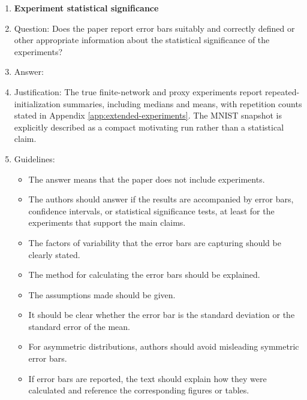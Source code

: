 \documentclass{article}
\begin{document}
\begin{enumerate}[leftmargin=1.5em]
\item {\bf Experiment statistical significance}
    \item[] Question: Does the paper report error bars suitably and correctly defined or other appropriate information about the statistical significance of the experiments?
    \item[] Answer: \answerYes{}
    \item[] Justification: The true finite-network and proxy experiments report repeated-initialization summaries, including medians and means, with repetition counts stated in Appendix \ref{app:extended-experiments}. The MNIST snapshot is explicitly described as a compact motivating run rather than a statistical claim.
    \item[] Guidelines:
    \begin{itemize}
        \item The answer \answerNA{} means that the paper does not include experiments.
        \item The authors should answer \answerYes{} if the results are accompanied by error bars, confidence intervals, or statistical significance tests, at least for the experiments that support the main claims.
        \item The factors of variability that the error bars are capturing should be clearly stated.
        \item The method for calculating the error bars should be explained.
        \item The assumptions made should be given.
        \item It should be clear whether the error bar is the standard deviation or the standard error of the mean.
        \item For asymmetric distributions, authors should avoid misleading symmetric error bars.
        \item If error bars are reported, the text should explain how they were calculated and reference the corresponding figures or tables.
    \end{itemize}


\end{enumerate}
\end{document}
